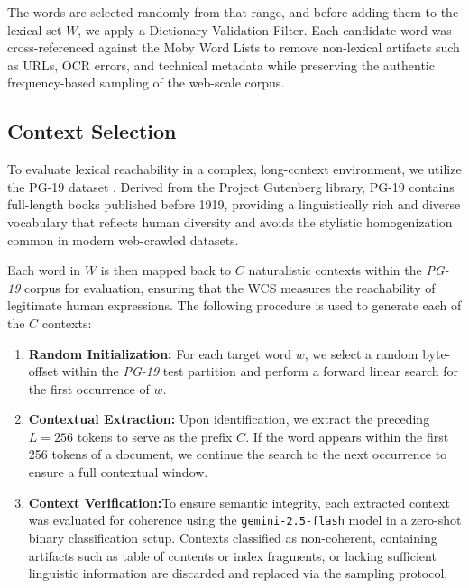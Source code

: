 \documentclass{article}
\begin{document}
The words are selected randomly from that range, and before adding them to the lexical set $W$, we apply a Dictionary-Validation Filter. Each candidate word was cross-referenced against the Moby Word Lists \cite{ward2002moby} to remove non-lexical artifacts such as URLs, OCR errors, and technical metadata while preserving the authentic frequency-based sampling of the web-scale corpus.

\subsection{Context Selection}

To evaluate lexical reachability in a complex, long-context environment, we utilize the PG-19 dataset \cite{rae2019compressive}. Derived from the Project Gutenberg library, PG-19 contains full-length books published before 1919, providing a linguistically rich and diverse vocabulary that reflects human diversity and avoids the stylistic homogenization common in modern web-crawled datasets.

Each word in $W$ is then mapped back to $C$ naturalistic contexts within the \textit{PG-19} corpus for evaluation, ensuring that the WCS measures the reachability of legitimate human expressions. The following procedure is used to generate each of the $C$ contexts:

\begin{enumerate}
    \item \textbf{Random Initialization:} For each target word $w$, we select a random byte-offset within the \textit{PG-19} test partition and perform a forward linear search for the first occurrence of $w$.
    \item \textbf{Contextual Extraction:} Upon identification, we extract the preceding $L=256$ tokens to serve as the prefix $C$. If the word appears within the first 256 tokens of a document, we continue the search to the next occurrence to ensure a full contextual window.
    \item \textbf{Context Verification:}To ensure semantic integrity, each extracted context was evaluated for coherence using the \texttt{gemini-2.5-flash} model \cite{gemini2025flash} in a zero-shot binary classification setup. Contexts classified as non-coherent, containing artifacts such as table of contents or index fragments, or lacking sufficient linguistic information are discarded and replaced via the sampling protocol.
\end{enumerate}
\end{document}
